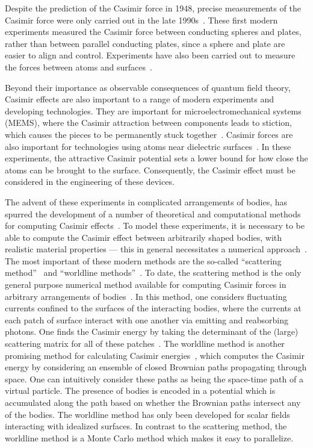 Despite the prediction of the Casimir force in 1948, precise measurements of the Casimir force were only
carried out in the late 1990s~\cite{Lamoreaux1997,Mohideen1998}.  
These first modern experiments measured the Casimir force between conducting spheres and plates, 
rather than between parallel conducting plates, since a sphere and plate are easier to align and control. 
Experiments have also been carried out to measure the forces between atoms and surfaces~\cite{Sukenik1993,Perreault2005,Harber2005}.

Beyond their importance as observable consequences of quantum field theory, Casimir effects are also 
important to a range of modern experiments and developing technologies.
They are important for microelectromechanical systems (MEMS), where the Casimir attraction between components 
leads to stiction, which causes the pieces to be permanently stuck together~\cite{Buks2001}.  
Casimir forces are also important for technologies using atoms near dielectric surfaces~\cite{Folman2000,Alton2011, Hung2013}.
In these experiments, the attractive Casimir potential sets a lower bound for how
close the atoms can be brought to the surface.  Consequently, the Casimir effect must be considered in the engineering 
of these devices.

The advent of these experiments in complicated arrangements of bodies, has spurred the development
of a number of theoretical and computational methods for computing Casimir effects~\cite{Dalvit2011,Bordag2009}. 
To model these experiments, it is necessary to be able to compute the Casimir effect between arbitrarily shaped bodies, with 
realistic material properties --- this in general necessitates a numerical approach~\cite{Johnson2011}.
The most important of these modern methods are the so-called ``scattering method''~\cite{Lambrecht2006,Rahi2009,Reid2009}
 and ``worldline methods''~\cite{Gies2003}.  To date, the scattering method is the only general purpose numerical method available for computing
Casimir forces in arbitrary arrangements of bodies~\cite{Reid2009,Reid2011,Reid2013}.  
In this method, one considers fluctuating currents confined to the surfaces of the interacting bodies,
where the currents at each patch of surface interact with one another via emitting and reabsorbing photons.
 One finds the Casimir energy by taking the determinant of the (large) scattering matrix for all of these patches~\cite{Reid2011}.  
The worldline method is another promising method for calculating Casimir energies~\cite{Gies2003},
which computes the Casimir energy by considering an ensemble of closed 
Brownian paths propagating through space.
 One can intuitively consider these paths as being the space-time path of a virtual particle.
 The presence of bodies is encoded in a potential which is
accumulated along the path based on whether the Brownian paths intersect any of the bodies.
The worldline method has only been developed for scalar fields interacting with idealized surfaces.
In contrast to the scattering method, the worldline method is a Monte Carlo method which makes it 
easy to parallelize.  

